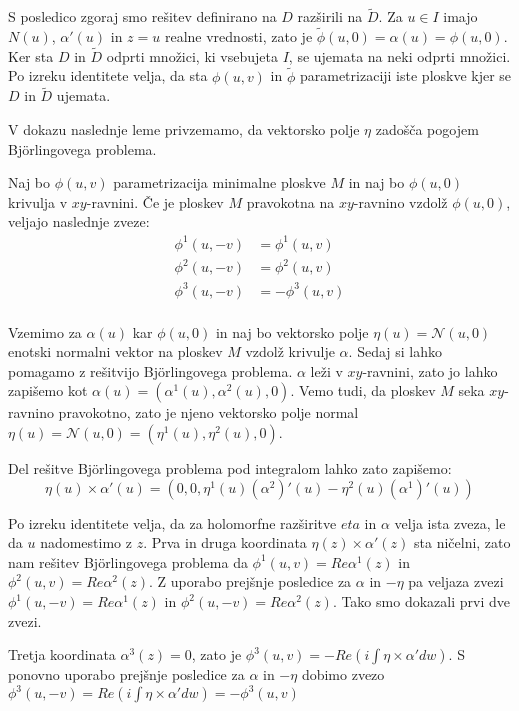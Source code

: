 \documentclass[mat1]{fmfdelo}
\begin{document}
S posledico zgoraj smo rešitev definirano na $D$ razširili na $\tilde{D}$. Za $u \in I$ imajo $N(u)$, $\alpha' (u)$ in $z = u$
realne vrednosti, zato je $\tilde{\phi} (u, 0) = \alpha (u) = \phi (u, 0)$. Ker sta $D$ in $\tilde{D}$ odprti množici, ki vsebujeta
$I$, se ujemata na neki odprti množici. Po izreku identitete velja, da sta $\phi (u, v)$ in $\tilde{\phi}$ parametrizaciji iste 
ploskve kjer se $D$ in $\tilde{D}$ ujemata.


V dokazu naslednje leme privzemamo, da vektorsko polje $\eta$ zadošča pogojem Björlingovega problema.

\begin{lema}
    Naj bo $\phi (u, v)$ parametrizacija minimalne ploskve $M$ in naj bo $\phi (u, 0)$ krivulja v $xy$-ravnini.
    Če je ploskev $M$ pravokotna na $xy$-ravnino vzdolž $\phi (u, 0)$, veljajo naslednje zveze:
    \begin{align*}
        \phi^{1} (u, - v) &= \phi^{1} (u, v) \\
        \phi^{2} (u, - v) &= \phi^{2} (u, v) \\
        \phi^{3} (u, - v) &= - \phi^{3} (u, v) \\ 
    \end{align*}
\end{lema}

\begin{dokaz}
    Vzemimo za $\alpha(u)$ kar $\phi (u, 0)$ in naj bo vektorsko polje $\eta (u) = \mathcal{N} (u, 0)$ enotski normalni 
    vektor na ploskev $M$ vzdolž krivulje $\alpha$. Sedaj si lahko pomagamo z rešitvijo Björlingovega problema.
    $\alpha$ leži v $xy$-ravnini, zato jo lahko zapišemo kot $\alpha (u) = \left( \alpha^{1} (u), \alpha^{2} (u), 0 \right)$.
    Vemo tudi, da ploskev $M$ seka $xy$-ravnino pravokotno, zato je njeno vektorsko polje normal
    $\eta (u) = \mathcal{N} (u, 0) = \left( \eta^{1} (u), \eta^{2} (u), 0 \right)$.

    Del rešitve Björlingovega problema pod integralom lahko zato zapišemo:
    $$ \eta (u) \times \alpha' (u) = \left( 0, 0, \eta^1 (u) (\alpha^2)' (u) - \eta^2 (u) (\alpha^1)' (u) \right) $$

    Po izreku identitete velja, da za holomorfne razširitve $eta$ in $\alpha$ velja ista zveza, le da $u$ nadomestimo z $z$.
    Prva in druga koordinata $\eta (z) \times \alpha' (z)$ sta ničelni, zato nam rešitev Björlingovega problema da 
    $\phi^{1} (u, v) = Re \alpha^{1} (z)$ in $\phi^{2} (u, v) = Re \alpha^{2} (z)$. Z uporabo prejšnje posledice za $\alpha$
    in $- \eta$ pa veljaza zvezi $\phi^{1} (u, - v) = Re \alpha^{1} (z)$ in $\phi^{2} (u, - v) = Re \alpha^{2} (z)$.
    Tako smo dokazali prvi dve zvezi.

    Tretja koordinata $\alpha^{3} (z) = 0$, zato je $ \phi^{3} (u, v) = - Re \left( i \int \eta \times \alpha' dw \right) $.
    S ponovno uporabo prejšnje posledice za $\alpha$ in $- \eta$ dobimo zvezo 
    $ \phi^{3} (u, - v) = Re \left( i \int \eta \times \alpha' dw \right) = - \phi^{3} (u, v) $
\end{dokaz}
\end{document}
